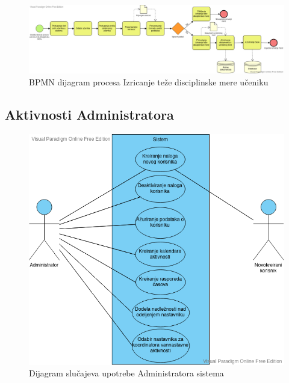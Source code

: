 \documentclass{article}
\begin{document}
\begin{landscape}
\begin{figure} [!ht]
    \begin{center}
        \includegraphics[scale=0.45]{imgs/BPMN_izricanje_teze_disciplinske_mere.png}
    \end{center}
\caption{BPMN dijagram procesa Izricanje teže disciplinske mere učeniku}
\end{figure}
\end{landscape}


\newpage
\subsection{Aktivnosti Administratora}

\begin{figure} [!ht]
    \begin{center}
        \includegraphics[scale=0.5]{imgs/admin_use_case.png}
    \end{center}
\caption{Dijagram slučajeva upotrebe Administratora sistema}
\end{figure}
\end{document}
